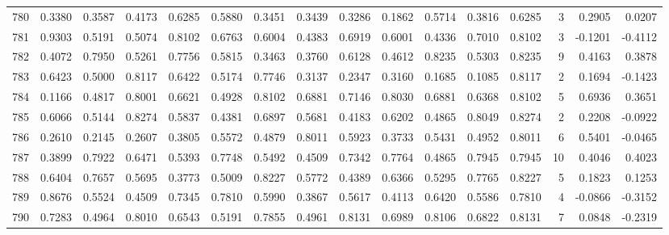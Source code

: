 \begin{tabular}{lrrrrrrrrrrrrrrr}
780 &      0.3380 &  0.3587 &  0.4173 &  0.6285 &  0.5880 &  0.3451 &  0.3439 &  0.3286 &  0.1862 &  0.5714 &   0.3816 &     0.6285 &      3 &                    0.2905 &                     0.0207 \\
781 &      0.9303 &  0.5191 &  0.5074 &  0.8102 &  0.6763 &  0.6004 &  0.4383 &  0.6919 &  0.6001 &  0.4336 &   0.7010 &     0.8102 &      3 &                   -0.1201 &                    -0.4112 \\
782 &      0.4072 &  0.7950 &  0.5261 &  0.7756 &  0.5815 &  0.3463 &  0.3760 &  0.6128 &  0.4612 &  0.8235 &   0.5303 &     0.8235 &      9 &                    0.4163 &                     0.3878 \\
783 &      0.6423 &  0.5000 &  0.8117 &  0.6422 &  0.5174 &  0.7746 &  0.3137 &  0.2347 &  0.3160 &  0.1685 &   0.1085 &     0.8117 &      2 &                    0.1694 &                    -0.1423 \\
784 &      0.1166 &  0.4817 &  0.8001 &  0.6621 &  0.4928 &  0.8102 &  0.6881 &  0.7146 &  0.8030 &  0.6881 &   0.6368 &     0.8102 &      5 &                    0.6936 &                     0.3651 \\
785 &      0.6066 &  0.5144 &  0.8274 &  0.5837 &  0.4381 &  0.6897 &  0.5681 &  0.4183 &  0.6202 &  0.4865 &   0.8049 &     0.8274 &      2 &                    0.2208 &                    -0.0922 \\
786 &      0.2610 &  0.2145 &  0.2607 &  0.3805 &  0.5572 &  0.4879 &  0.8011 &  0.5923 &  0.3733 &  0.5431 &   0.4952 &     0.8011 &      6 &                    0.5401 &                    -0.0465 \\
787 &      0.3899 &  0.7922 &  0.6471 &  0.5393 &  0.7748 &  0.5492 &  0.4509 &  0.7342 &  0.7764 &  0.4865 &   0.7945 &     0.7945 &     10 &                    0.4046 &                     0.4023 \\
788 &      0.6404 &  0.7657 &  0.5695 &  0.3773 &  0.5009 &  0.8227 &  0.5772 &  0.4389 &  0.6366 &  0.5295 &   0.7765 &     0.8227 &      5 &                    0.1823 &                     0.1253 \\
789 &      0.8676 &  0.5524 &  0.4509 &  0.7345 &  0.7810 &  0.5990 &  0.3867 &  0.5617 &  0.4113 &  0.6420 &   0.5586 &     0.7810 &      4 &                   -0.0866 &                    -0.3152 \\
790 &      0.7283 &  0.4964 &  0.8010 &  0.6543 &  0.5191 &  0.7855 &  0.4961 &  0.8131 &  0.6989 &  0.8106 &   0.6822 &     0.8131 &      7 &                    0.0848 &                    -0.2319 \\

\end{tabular}
